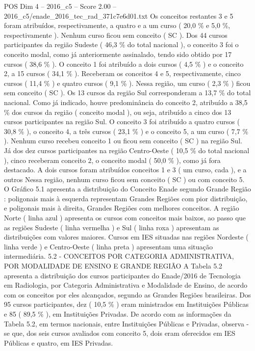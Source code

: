 \begin{textsample}{POS Dim 4 – 2016\_c5 – Score 2.00 – 2016\_c5/enade\_2016\_tec\_rad\_371c7e6d01.txt}
Os conceitos restantes 3 e 5 foram atribuídos, respectivamente, a quatro e a um curso ( 20,0 \% e 5,0 \%, respectivamente ).
Nenhum curso ficou sem conceito ( SC ).
Dos 44 cursos participantes da região Sudeste ( 46,3 \% do total nacional ), o conceito 3 foi o conceito modal, como já anteriormente assinalado, tendo sido obtido por 17 cursos ( 38,6 \% ).
O conceito 1 foi atribuído a dois cursos ( 4,5 \% ) e o conceito 2, a 15 cursos ( 34,1 \% ).
Receberam os conceitos 4 e 5, respectivamente, cinco cursos ( 11,4 \% ) e quatro cursos ( 9,1 \% ).
Nessa região, um curso ( 2,3 \% ) ficou sem conceito ( SC ).
Os 13 cursos da região Sul corresponderam a 13,7 \% do total nacional.
Como já indicado, houve predominância do conceito 2, atribuído a 38,5 \% dos cursos da região ( conceito modal ), ou seja, atribuído a cinco dos 13 cursos participantes na região Sul.
O conceito 3 foi atribuído a quatro cursos ( 30,8 \% ), o conceito 4, a três cursos ( 23,1 \% ) e o conceito 5, a um curso ( 7,7 \% ).
Nenhum curso recebeu conceito 1 ou ficou sem conceito ( SC ) na região Sul.
Já dos dez cursos participantes na região Centro-Oeste ( 10,5 \% do total nacional ), cinco receberam conceito 2, o conceito modal ( 50,0 \% ), como já fora destacado.
A dois cursos foram atribuídos conceitos 1 e 3 ( um curso, cada ), e a outros Nessa região, nenhum curso ficou sem conceito ( SC ) ou com conceito 5.
O Gráfico 5.1 apresenta a distribuição do Conceito Enade segundo Grande Região : poligonais mais à esquerda representam Grandes Regiões com pior distribuição, e poligonais mais à direita, Grandes Regiões com melhores conceitos.
A região Norte ( linha azul ) apresenta os cursos com conceitos mais baixos, ao passo que as regiões Sudeste ( linha vermelha ) e Sul ( linha roxa ) apresentam as distribuições com valores maiores.
Cursos em IES situadas nas regiões Nordeste ( linha verde ) e Centro-Oeste ( linha preta ) apresentam uma situação intermediária. 5.2 - CONCEITOS POR CATEGORIA ADMINISTRATIVA, POR MODALIDADE DE ENSINO E GRANDE REGIÃO A Tabela 5.2 apresenta a distribuição dos cursos participantes do Enade/2016 de Tecnologia em Radiologia, por Categoria Administrativa e Modalidade de Ensino, de acordo com os conceitos por eles alcançados, segundo as Grandes Regiões brasileiras.
Dos 95 cursos participantes, dez ( 10,5 \% ) eram ministrados em Instituições Públicas e 85 ( 89,5 \% ), em Instituições Privadas.
De acordo com as informações da Tabela 5.2, em termos nacionais, entre Instituições Públicas e Privadas, observa -se que, dos seis cursos avaliados com conceito 5, dois eram oferecidos em IES Públicas e quatro, em IES Privadas.

\end{textsample}
